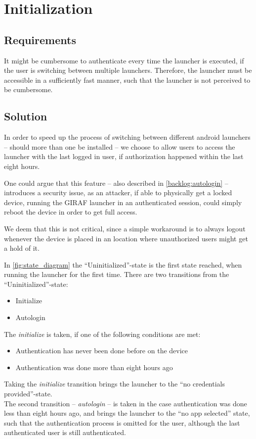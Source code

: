 \section{Initialization}
\label{design:initialization}

\subsection*{Requirements}
It might be cumbersome to authenticate every time the \giraf[] launcher is executed, if the user is switching between multiple launchers. Therefore, the launcher must be accessible in a sufficiently fast manner, such that the launcher is not perceived to be cumbersome.

\subsection*{Solution}
In order to speed up the process of switching between different android launchers -- should more than one be installed -- we choose to allow users to access the launcher with the last logged in user, if authorization happened within the last eight hours.

One could argue that this feature -- also described in \autoref{backlog:autologin} -- introduces a security issue, as an attacker, if able to physically get a locked device, running the GIRAF launcher in an authenticated session, could simply reboot the device in order to get full access.

We deem that this is not critical, since a simple workaround is to always logout whenever the device is placed in an location where unauthorized users might get a hold of it.

In \autoref{fig:state_diagram} the ``Uninitialized''-state is the first state reached, when running the launcher for the first time. There are two transitions from the ``Uninitialized''-state:

\begin{itemize}
	\item Initialize
	\item Autologin
\end{itemize}

The \emph{initialize} is taken, if one of the following conditions are met: 

\begin{itemize}
	\item Authentication has never been done before on the device
	\item Authentication was done more than eight hours ago
\end{itemize}

Taking the \emph{initialize} transition brings the launcher to the ``no credentials provided''-state. \\

The second transition -- \emph{autologin} -- is taken in the case authentication was done less than eight hours ago, and brings the launcher to the ``no app selected'' state, such that the authentication process is omitted for the user, although the last authenticated user is still authenticated.